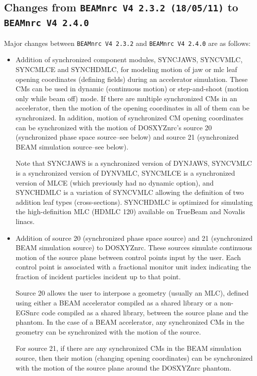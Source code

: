 \documentclass[12pt,twoside]{article}
\begin{document}
\subsection{Changes from {\tt BEAMnrc V4 2.3.2 (18/05/11)} to {\tt BEAMnrc V4 2.4.0}}

Major changes between {\tt BEAMnrc V4 2.3.2} and {\tt BEAMnrc V4 2.4.0} are
as follows:

\begin{itemize}

\item Addition of synchronized component modules, SYNCJAWS, SYNCVMLC, SYNCMLCE and
SYNCHDMLC, for modeling motion of jaw or mlc leaf opening coordinates (defining fields) during an accelerator
simulation.  These CMs can be used in dynamic (continuous motion)
or step-and-shoot (motion only while beam off) mode.  If there are multiple synchronized CMs in an accelerator, then the motion of the opening coordinates in all of
them can be synchronized.  In addition, motion of synchronized CM opening coordinates
can be synchronized with the motion of DOSXYZnrc's source 20 (synchronized
phase space source--see below) and source 21 (synchronized BEAM simulation source--see below).

Note that SYNCJAWS is a synchronized version of DYNJAWS,
SYNCVMLC is a synchronized version of DYNVMLC, SYNCMLCE is a synchronized version of
MLCE (which previously had no dynamic option), and SYNCHDMLC is
a variation of SYNCVMLC allowing the definition of two addition leaf types
(cross-sections).  SYNCHDMLC is optimized for simulating the high-definition
MLC (HDMLC 120) available on TrueBeam and Novalis linacs.

\item Addition of source 20 (synchronized phase space source) and 21 (synchronized
BEAM simulation source) to DOSXYZnrc.  These sources simulate continuous motion
of the source plane between control points input by the user.  Each control point
is associated with a fractional monitor unit index indicating the fraction of
incident particles incident up to that point.

Source 20 allows the user to interpose a geometry (usually an MLC), defined using
either a BEAM accelerator compiled as a shared library or a non-EGSnrc code
compiled as a shared library, between the source plane and the phantom.  In the
case of a BEAM accelerator, any synchronized CMs in the geometry can be synchronized
with the motion of the source.

For source 21, if there are any synchronized CMs in the BEAM simulation source,
then their motion (changing opening coordinates) can be synchronized with the
motion of the source plane around the DOSXYZnrc phantom.


\end{itemize}
\end{document}
